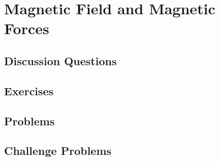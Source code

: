 
\chapter{Magnetic Field and Magnetic Forces}

\section{Discussion Questions}

\section{Exercises}

\section{Problems}

\section{Challenge Problems}
